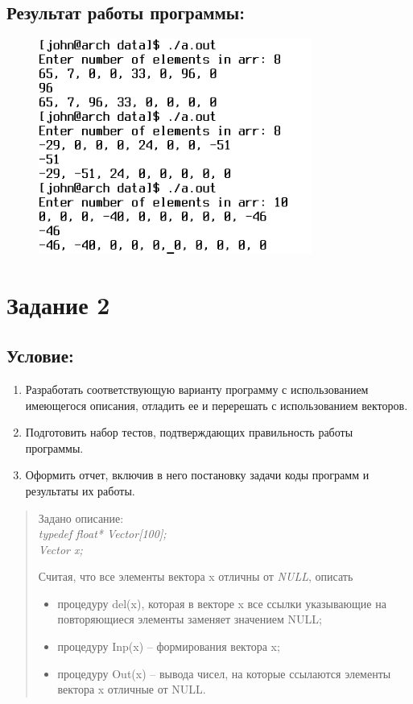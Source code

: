 \documentclass[14pt,a4paper]{article}
\begin{document}
\subsection{Результат работы программы:}
\begin{figure}[H]
  \includegraphics[width=0.8\textwidth]{data/demo18_1.png}
\end{figure}
\section*{Задание 2}
\setcounter{subsection}{0}
\subsection{Условие:}
\begin{enumerate}
  \item Разработать соответствующую варианту программу с использованием
    имеющегося описания, отладить ее и перерешать с использованием векторов.
  \item Подготовить набор тестов, подтверждающих правильность работы программы.
  \item Оформить отчет, включив в него постановку задачи коды программ и
    результаты их работы.
\end{enumerate}
\begin{quote}
  \begin{small}
    Задано описание:\\[1mm]

    \textsl{
      typedef float* Vector[100];\\
      Vector x;
    }

    Считая, что все элементы вектора x отличны от \textsl{NULL}, описать

    \begin{itemize}
      \item процедуру del(x), которая в векторе x все ссылки указывающие на
        повторяющиеся элементы заменяет значением NULL;
      \item процедуру Inp(x) – формирования вектора x;
      \item процедуру Out(x) – вывода чисел, на которые ссылаются элементы
        вектора x отличные от NULL.
    \end{itemize}
  \end{small}
\end{quote}
\end{document}
